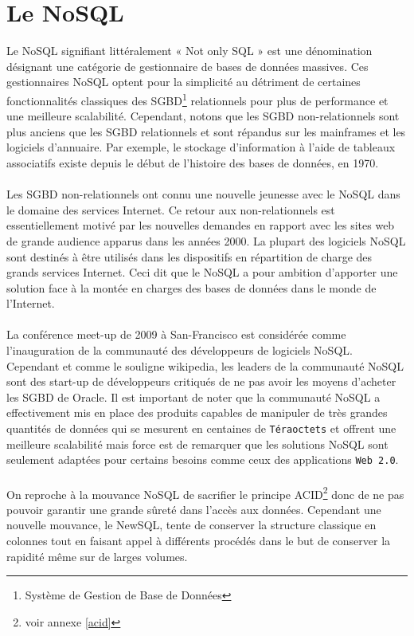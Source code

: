 \section{Le \textsf{NoSQL}}

Le \textsf{NoSQL} signifiant littéralement « \textsf{Not only SQL} » est une
dénomination désignant une catégorie de gestionnaire de bases de
données massives. Ces gestionnaires \textsf{NoSQL} optent pour la
simplicité au détriment de certaines fonctionnalités classiques des
\textsf{SGBD}\footnote{Système de Gestion de Base de Données}
relationnels pour plus de performance et une meilleure
scalabilité. Cependant, notons que les \textsf{SGBD} non-relationnels
sont plus anciens que les \textsf{SGBD} relationnels et sont répandus
sur les mainframes et les logiciels d'annuaire. Par exemple, le
stockage d'information à l'aide de tableaux associatifs existe depuis
le début de l'histoire des bases de données, en 1970.  \\ \\ Les
\textsf{SGBD} non-relationnels ont connu une nouvelle jeunesse avec le
\textsf{NoSQL} dans le domaine des services \textsf{Internet}. Ce
retour aux non-relationnels est essentiellement motivé par les
nouvelles demandes en rapport avec les sites web de grande audience
apparus dans les années 2000. La plupart des logiciels \textsf{NoSQL}
sont destinés à être utilisés dans les dispositifs en répartition de
charge des grands services \textsf{Internet}. Ceci dit que le
\textsf{NoSQL} a pour ambition d'apporter une solution face à la
montée en charges des bases de données dans le monde de
l'\textsf{Internet}.  \\ \\ La conférence meet-up de 2009 à \textsf{San-Francisco} est considérée comme
l'inauguration de la communauté des développeurs de logiciels
\textsf{NoSQL}. Cependant et comme le souligne \textsf{wikipedia}, les
leaders de la communauté \textsf{NoSQL} sont des \textsf{start-up} de
développeurs critiqués de ne pas avoir les moyens d'acheter les
\textsf{SGBD} de Oracle. Il est important de noter que
la communauté \textsf{NoSQL} a effectivement mis en place des produits
capables de manipuler de très grandes quantités de données qui se
mesurent en centaines de \texttt{Téraoctets} et offrent une meilleure
scalabilité mais force est de remarquer que les solutions
\textsf{NoSQL} sont seulement adaptées pour certains besoins comme
ceux des applications \texttt{Web 2.0}.  \\\\ On reproche à la
mouvance \textsf{NoSQL} de sacrifier le principe
\textsf{ACID}\footnote{voir annexe \ref{acid}}  donc de ne
pas pouvoir garantir une grande sûreté dans l'accès aux
données. Cependant une nouvelle mouvance, le \textsf{NewSQL}, tente de
conserver la structure classique en colonnes tout en faisant appel à
différents procédés dans le but de conserver la rapidité même sur de
larges volumes\cite{newSQL}.

